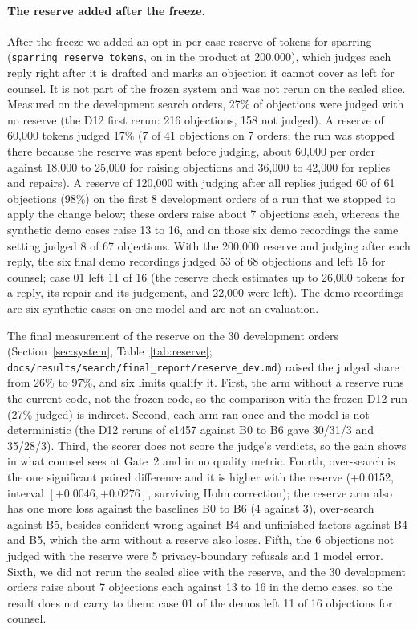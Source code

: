 \paragraph{The reserve added after the freeze.} After the freeze we added an opt-in per-case reserve of tokens for sparring (\texttt{sparring\_reserve\_tokens}, on in the product at 200,000), which judges each reply right after it is drafted and marks an objection it cannot cover as left for counsel. It is not part of the frozen system and was not rerun on the sealed slice. Measured on the development search orders, 27\% of objections were judged with no reserve (the D12 first rerun: 216 objections, 158 not judged). A reserve of 60,000 tokens judged 17\% (7 of 41 objections on 7 orders; the run was stopped there because the reserve was spent before judging, about 60,000 per order against 18,000 to 25,000 for raising objections and 36,000 to 42,000 for replies and repairs). A reserve of 120,000 with judging after all replies judged 60 of 61 objections (98\%) on the first 8 development orders of a run that we stopped to apply the change below; these orders raise about 7 objections each, whereas the synthetic demo cases raise 13 to 16, and on those six demo recordings the same setting judged 8 of 67 objections. With the 200,000 reserve and judging after each reply, the six final demo recordings judged 53 of 68 objections and left 15 for counsel; case 01 left 11 of 16 (the reserve check estimates up to 26,000 tokens for a reply, its repair and its judgement, and 22,000 were left). The demo recordings are six synthetic cases on one model and are not an evaluation.

The final measurement of the reserve on the 30 development orders (Section~\ref{sec:system}, Table~\ref{tab:reserve}; \texttt{docs/results/search/\allowbreak final\_report/\allowbreak reserve\_dev.md}) raised the judged share from 26\% to 97\%, and six limits qualify it. First, the arm without a reserve runs the current code, not the frozen code, so the comparison with the frozen D12 run (27\% judged) is indirect. Second, each arm ran once and the model is not deterministic (the D12 reruns of c1457 against B0 to B6 gave 30/31/3 and 35/28/3). Third, the scorer does not score the judge's verdicts, so the gain shows in what counsel sees at Gate~2 and in no quality metric. Fourth, over-search is the one significant paired difference and it is higher with the reserve (+0.0152, interval $[+0.0046, +0.0276]$, surviving Holm correction); the reserve arm also has one more loss against the baselines B0 to B6 (4 against 3), over-search against B5, besides confident wrong against B4 and unfinished factors against B4 and B5, which the arm without a reserve also loses. Fifth, the 6 objections not judged with the reserve were 5 privacy-boundary refusals and 1 model error. Sixth, we did not rerun the sealed slice with the reserve, and the 30 development orders raise about 7 objections each against 13 to 16 in the demo cases, so the result does not carry to them: case 01 of the demos left 11 of 16 objections for counsel.

